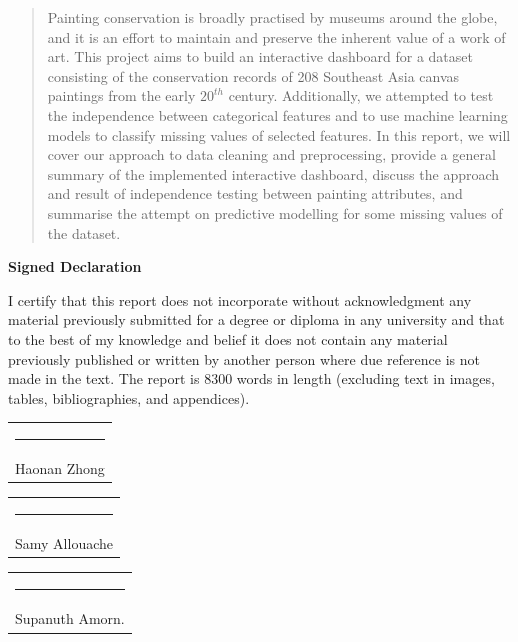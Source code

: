 \documentclass[11pt, oneside]{article}
\begin{document}


\thispagestyle{empty}
\null\vspace{\fill}
\begin{abstract}
\noindent Painting conservation is broadly practised by museums around the globe, and it is an effort to maintain and preserve the inherent value of a work of art. This project aims to build an interactive dashboard for a dataset consisting of the conservation records of 208 Southeast Asia canvas paintings from the early $20^{th}$ century. Additionally, we attempted to test the independence between categorical features and to use machine learning models to classify missing values of selected features.
\bigbreak
\noindent In this report, we will cover our approach to data cleaning and preprocessing, provide a general summary of the implemented interactive dashboard, discuss the approach and result of independence testing between painting attributes, and summarise the attempt on predictive modelling for some missing values of the dataset. 
\end{abstract}
\vspace{\fill}

\newpage
\thispagestyle{empty}
\vspace*{\fill}
\begin{center}
    \textbf{Signed Declaration}
\end{center}

    \noindent I certify that this report does not incorporate without acknowledgment any material previously submitted for a degree or diploma in any university and that to the best of my knowledge and belief it does not contain any material previously published or written by another person where due reference is not made in the text. The report is 8300 words in length (excluding text in images, tables, bibliographies, and appendices).
    
\vspace*{4em}\noindent
\hfill%
\begin{tabular}[t]{c}
  \rule{10em}{0.4pt}\\ Haonan Zhong
\end{tabular}%

    \vspace*{4em}\noindent
\hfill%
\begin{tabular}[t]{c}
  \rule{10em}{0.4pt}\\ Samy Allouache
\end{tabular}%

    \vspace*{4em}\noindent
\hfill%
\begin{tabular}[t]{c}
  \rule{10em}{0.4pt} \\ Supanuth Amorn.
\end{tabular}%
\end{document}
